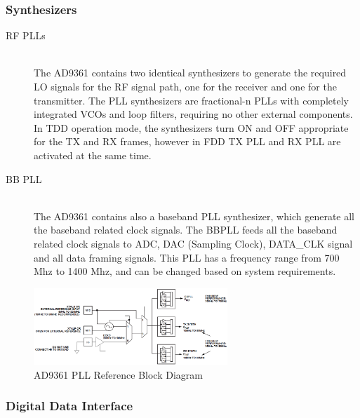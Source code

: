\subsubsection{Synthesizers}

\begin{description}
	\item[RF PLLs] \hfill \\
	The AD9361 contains two identical synthesizers to generate the required LO signals for the RF signal path, one for the receiver and one for the transmitter. The PLL synthesizers are fractional-n PLLs with completely integrated VCOs and loop filters, requiring no other external components. In TDD operation mode, the synthesizers turn ON and OFF appropriate for the TX and RX frames, however in FDD TX PLL and RX PLL are activated at the same time.

	\item[BB PLL] \hfill \\
	The AD9361 contains also a baseband PLL synthesizer, which generate all the baseband related clock signals. The BBPLL feeds all the baseband related clock signals to ADC, DAC (Sampling Clock), DATA\_CLK signal and all data framing signals. This PLL has a frequency range from 700 Mhz to 1400 Mhz, and can be changed based on system requirements.

\end{description}

\begin{figure}[htbp]
    \centering
    \includegraphics[width=0.65\textwidth]{./figures/pll_ref_block}
    \caption{ AD9361 PLL Reference Block Diagram
    \label{fig:pll}}
\end{figure}

\subsubsection{Digital Data Interface}

